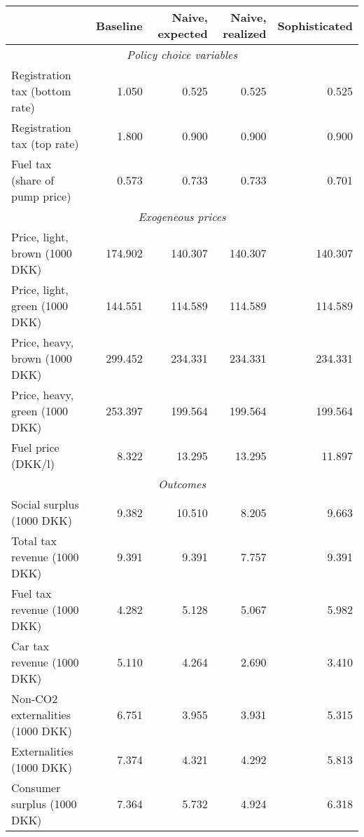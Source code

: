 

\begin{tabular}{lrrrr} 
\toprule 
                                         &     Baseline& Naive, expected& Naive, realized& Sophisticated \\ 
\midrule 
\multicolumn{5}{c}{\emph{Policy choice variables}} \\ 
\midrule
          Registration tax (bottom rate) &        1.050&        0.525&        0.525&        0.525 \\ 
             Registration tax (top rate) &        1.800&        0.900&        0.900&        0.900 \\ 
          Fuel tax (share of pump price) &        0.573&        0.733&        0.733&        0.701 \\ 
\midrule 
\multicolumn{5}{c}{\emph{Exogeneous prices}} \\ 
\midrule
          Price, light, brown (1000 DKK) &      174.902&      140.307&      140.307&      140.307 \\ 
          Price, light, green (1000 DKK) &      144.551&      114.589&      114.589&      114.589 \\ 
          Price, heavy, brown (1000 DKK) &      299.452&      234.331&      234.331&      234.331 \\ 
          Price, heavy, green (1000 DKK) &      253.397&      199.564&      199.564&      199.564 \\ 
                      Fuel price (DKK/l) &        8.322&       13.295&       13.295&       11.897 \\ 
\midrule 
\multicolumn{5}{c}{\emph{Outcomes}} \\ 
\midrule
               Social surplus (1000 DKK) &        9.382&       10.510&        8.205&        9.663 \\ 
            Total tax revenue (1000 DKK) &        9.391&        9.391&        7.757&        9.391 \\ 
             Fuel tax revenue (1000 DKK) &        4.282&        5.128&        5.067&        5.982 \\ 
              Car tax revenue (1000 DKK) &        5.110&        4.264&        2.690&        3.410 \\ 
        Non-CO2 externalities (1000 DKK) &        6.751&        3.955&        3.931&        5.315 \\ 
                Externalities (1000 DKK) &        7.374&        4.321&        4.292&        5.813 \\ 
             Consumer surplus (1000 DKK) &        7.364&        5.732&        4.924&        6.318 \\ 

\end{tabular}
